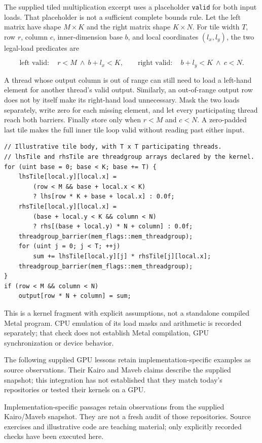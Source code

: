 The supplied tiled multiplication excerpt uses a placeholder \texttt{valid} for both input loads. That placeholder is not a sufficient complete bounds rule. Let the left matrix have shape \(M\times K\) and the right matrix shape \(K\times N\). For tile width \(T\), row \(r\), column \(c\), inner-dimension base \(b\), and local coordinates \((l_x,l_y)\), the two legal-load predicates are

\[
\text{left valid}:\quad r<M\ \land\ b+l_x<K,
\qquad
\text{right valid}:\quad b+l_y<K\ \land\ c<N.
\]

A thread whose output column is out of range can still need to load a left-hand element for another thread's valid output. Similarly, an out-of-range output row does not by itself make its right-hand load unnecessary. Mask the two loads separately, write zero for each missing element, and let every participating thread reach both barriers. Finally store only when \(r<M\) and \(c<N\). A zero-padded last tile makes the full inner tile loop valid without reading past either input.

\begin{verbatim}
// Illustrative tile body, with T x T participating threads.
// lhsTile and rhsTile are threadgroup arrays declared by the kernel.
for (uint base = 0; base < K; base += T) {
    lhsTile[local.y][local.x] =
        (row < M && base + local.x < K)
        ? lhs[row * K + base + local.x] : 0.0f;
    rhsTile[local.y][local.x] =
        (base + local.y < K && column < N)
        ? rhs[(base + local.y) * N + column] : 0.0f;
    threadgroup_barrier(mem_flags::mem_threadgroup);
    for (uint j = 0; j < T; ++j)
        sum += lhsTile[local.y][j] * rhsTile[j][local.x];
    threadgroup_barrier(mem_flags::mem_threadgroup);
}
if (row < M && column < N)
    output[row * N + column] = sum;
\end{verbatim}

This is a kernel fragment with explicit assumptions, not a standalone compiled Metal program. CPU emulation of its load masks and arithmetic is recorded separately; that check does not establish Metal compilation, GPU synchronization or device behavior.

The following supplied GPU lessons retain implementation-specific examples as source observations. Their Kairo and Maveb claims describe the supplied snapshot; this integration has not established that they match today's repositories or tested their kernels on a GPU.

Implementation-specific passages retain observations from the supplied Kairo/Maveb snapshot. They are not a fresh audit of those repositories. Source exercises and illustrative code are teaching material; only explicitly recorded checks have been executed here.

